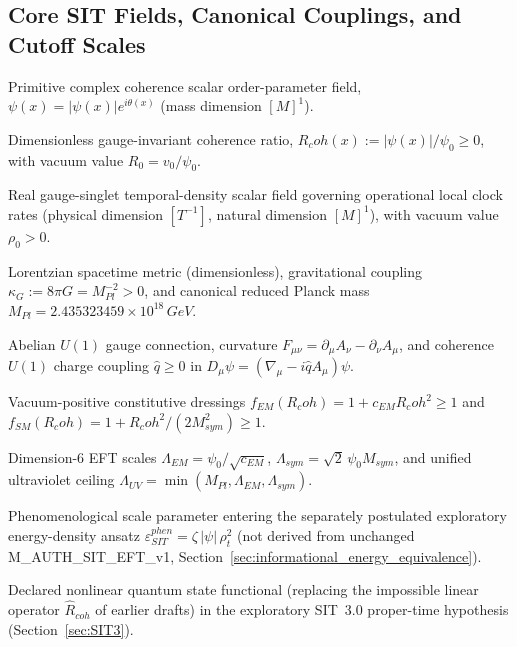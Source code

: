 \documentclass[american,11pt,letterpaper]{article}
\newcommand{\Rcoh}{R_{\mathrm{coh}}}
\def\mathcal#1{#1}%
\def\mathrm#1{#1}%
\def\texttt#1{#1}%
\def\Rcoh{R_coh}%
\begin{document}
\subsection*{Core SIT Fields, Canonical Couplings, and Cutoff Scales}

\begin{description}[leftmargin=2.4cm, style=nextline]
  \item[$\psi(x)$] Primitive complex coherence scalar order-parameter field, $\psi(x) = |\psi(x)| e^{i\theta(x)}$ (mass dimension $[M]^1$).
  \item[$\Rcoh(x)$] Dimensionless gauge-invariant coherence ratio, $\Rcoh(x) := |\psi(x)|/\psi_0 \ge 0$, with vacuum value $R_0 = v_0/\psi_0$.
  \item[$\rho_t(x)$] Real gauge-singlet temporal-density scalar field governing operational local clock rates (physical dimension $[T^{-1}]$, natural dimension $[M]^1$), with vacuum value $\rho_0 > 0$.
  \item[$g_{\mu\nu},\,\kappa_G,\,M_{\mathrm{Pl}}$] Lorentzian spacetime metric (dimensionless), gravitational coupling $\kappa_G := 8\pi G = M_{\mathrm{Pl}}^{-2} > 0$, and canonical reduced Planck mass $M_{\mathrm{Pl}} = 2.435323459\times 10^{18}\,\mathrm{GeV}$.
  \item[$A_\mu,\,F_{\mu\nu},\,\hat{q}$] Abelian $U(1)$ gauge connection, curvature $F_{\mu\nu} = \partial_\mu A_\nu - \partial_\nu A_\mu$, and coherence $U(1)$ charge coupling $\hat{q} \ge 0$ in $D_\mu\psi = (\nabla_\mu - i\hat{q}A_\mu)\psi$.
  \item[$f_{\mathrm{EM}}(\Rcoh),\,f_{\mathrm{SM}}(\Rcoh)$] Vacuum-positive constitutive dressings $f_{\mathrm{EM}}(\Rcoh) = 1 + c_{\mathrm{EM}}\Rcoh^2 \ge 1$ and $f_{\mathrm{SM}}(\Rcoh) = 1 + \Rcoh^2/(2 M_{\mathrm{sym}}^2) \ge 1$.
  \item[$\Lambda_{\mathrm{EM}},\,\Lambda_{\mathrm{sym}},\,\Lambda_{\mathrm{UV}}$] Dimension-6 EFT scales $\Lambda_{\mathrm{EM}} = \psi_0/\sqrt{c_{\mathrm{EM}}}$, $\Lambda_{\mathrm{sym}} = \sqrt{2}\,\psi_0 M_{\mathrm{sym}}$, and unified ultraviolet ceiling $\Lambda_{\mathrm{UV}} = \min(M_{\mathrm{Pl}}, \Lambda_{\mathrm{EM}}, \Lambda_{\mathrm{sym}})$.
  \item[$\zeta$] Phenomenological scale parameter entering the separately postulated exploratory energy-density ansatz $\varepsilon_{\mathrm{SIT}}^{\mathrm{phen}} = \zeta\,|\psi|\,\rho_t^2$ (not derived from unchanged \texttt{M\_AUTH\_SIT\_EFT\_v1}, Section~\ref{sec:informational_energy_equivalence}).
  \item[{$\mathcal{C}_{\mathrm{state}}[\rho]$}] Declared nonlinear quantum state functional (replacing the impossible linear operator $\hat{\mathcal{R}}_{\mathrm{coh}}$ of earlier drafts) in the exploratory SIT~3.0 proper-time hypothesis (Section~\ref{sec:SIT3}).
\end{description}
\end{document}
